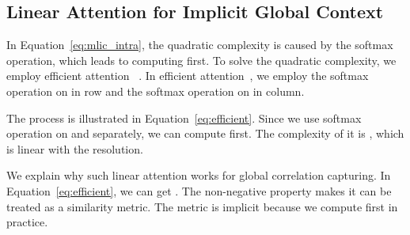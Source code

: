 \documentclass{article}
\theoremstyle{plain}
\theoremstyle{definition}
\theoremstyle{remark}
\begin{document}
  \subsection{Linear Attention for Implicit Global Context}
  \label{sec:method:linear}
  In Equation~\ref{eq:mlic_intra}, 
  the quadratic complexity is caused by the softmax operation, which
  leads to computing  first.
  To solve the quadratic complexity, we employ efficient attention
  ~\cite{shen2021efficient}.
  In efficient attention~\cite{shen2021efficient}, 
  we employ the softmax operation on  in 
  row and the softmax operation on  in 
  column.
  
  The process is illustrated in Equation~\ref{eq:efficient}.
  Since we use softmax operation on  and 
   separately, we can compute
   first.
  The complexity of it is , which is linear with the resolution.\par
  We explain why such linear attention works for global correlation capturing.
  In Equation~\ref{eq:efficient}, we can get
  .
  The non-negative property makes it can be treated as a similarity metric.
  The metric is implicit  because we compute
   first
  in practice.
\end{document}
